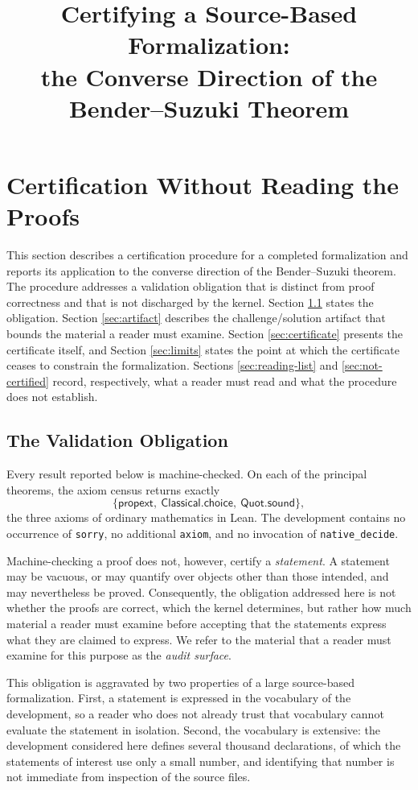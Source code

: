 \documentclass{article}
\title{Certifying a Source-Based Formalization:\\
the Converse Direction of the Bender--Suzuki Theorem}
\author{}
\date{}
\begin{document}
\maketitle

\section{Certification Without Reading the Proofs}
\label{sec:certification}

This section describes a certification procedure for a completed formalization
and reports its application to the converse direction of the Bender--Suzuki
theorem. The procedure addresses a validation obligation that is distinct from
proof correctness and that is not discharged by the kernel. Section
\ref{sec:validation-obligation} states the obligation. Section
\ref{sec:artifact} describes the challenge/solution artifact that bounds the
material a reader must examine. Section \ref{sec:certificate} presents the
certificate itself, and Section \ref{sec:limits} states the point at which the
certificate ceases to constrain the formalization. Sections
\ref{sec:reading-list} and \ref{sec:not-certified} record, respectively, what a
reader must read and what the procedure does not establish.

\subsection{The Validation Obligation}
\label{sec:validation-obligation}

Every result reported below is machine-checked. On each of the principal
theorems, the axiom census returns exactly
\[
  \{\mathsf{propext},\ \mathsf{Classical.choice},\ \mathsf{Quot.sound}\},
\]
the three axioms of ordinary mathematics in Lean. The development contains no
occurrence of \verb|sorry|, no additional \verb|axiom|, and no invocation of
\verb|native_decide|.

Machine-checking a proof does not, however, certify a \emph{statement}. A
statement may be vacuous, or may quantify over objects other than those
intended, and may nevertheless be proved. Consequently, the obligation
addressed here is not whether the proofs are correct, which the kernel
determines, but rather how much material a reader must examine before accepting
that the statements express what they are claimed to express. We refer to the
material that a reader must examine for this purpose as the \emph{audit
surface}.

This obligation is aggravated by two properties of a large source-based
formalization. First, a statement is expressed in the vocabulary of the
development, so a reader who does not already trust that vocabulary cannot
evaluate the statement in isolation. Second, the vocabulary is extensive: the
development considered here defines several thousand declarations, of which the
statements of interest use only a small number, and identifying that number is
not immediate from inspection of the source files.
\end{document}
